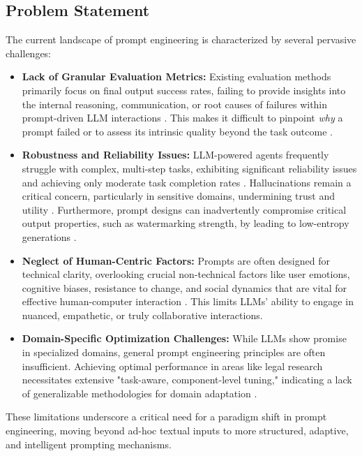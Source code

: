 \documentclass{article}
\begin{document}
\subsection{Problem Statement}
The current landscape of prompt engineering is characterized by several pervasive challenges:
\begin{itemize}
    \item \textbf{Lack of Granular Evaluation Metrics:} Existing evaluation methods primarily focus on final output success rates, failing to provide insights into the internal reasoning, communication, or root causes of failures within prompt-driven LLM interactions \citep{paper1}. This makes it difficult to pinpoint \textit{why} a prompt failed or to assess its intrinsic quality beyond the task outcome \citep{paper5}.
    \item \textbf{Robustness and Reliability Issues:} LLM-powered agents frequently struggle with complex, multi-step tasks, exhibiting significant reliability issues and achieving only moderate task completion rates \citep{paper1}. Hallucinations remain a critical concern, particularly in sensitive domains, undermining trust and utility \citep{paper5}. Furthermore, prompt designs can inadvertently compromise critical output properties, such as watermarking strength, by leading to low-entropy generations \citep{paper3}.
    \item \textbf{Neglect of Human-Centric Factors:} Prompts are often designed for technical clarity, overlooking crucial non-technical factors like user emotions, cognitive biases, resistance to change, and social dynamics that are vital for effective human-computer interaction \citep{paper2}. This limits LLMs' ability to engage in nuanced, empathetic, or truly collaborative interactions.
    \item \textbf{Domain-Specific Optimization Challenges:} While LLMs show promise in specialized domains, general prompt engineering principles are often insufficient. Achieving optimal performance in areas like legal research necessitates extensive "task-aware, component-level tuning," indicating a lack of generalizable methodologies for domain adaptation \citep{paper5}.
\end{itemize}
These limitations underscore a critical need for a paradigm shift in prompt engineering, moving beyond ad-hoc textual inputs to more structured, adaptive, and intelligent prompting mechanisms.
\end{document}
